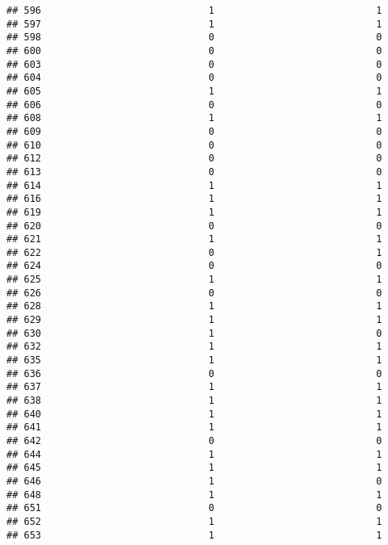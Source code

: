 \documentclass[
]{article}
\begin{document}
\begin{verbatim}
## 596                             1                            1
## 597                             1                            1
## 598                             0                            0
## 600                             0                            0
## 603                             0                            0
## 604                             0                            0
## 605                             1                            1
## 606                             0                            0
## 608                             1                            1
## 609                             0                            0
## 610                             0                            0
## 612                             0                            0
## 613                             0                            0
## 614                             1                            1
## 616                             1                            1
## 619                             1                            1
## 620                             0                            0
## 621                             1                            1
## 622                             0                            1
## 624                             0                            0
## 625                             1                            1
## 626                             0                            0
## 628                             1                            1
## 629                             1                            1
## 630                             1                            0
## 632                             1                            1
## 635                             1                            1
## 636                             0                            0
## 637                             1                            1
## 638                             1                            1
## 640                             1                            1
## 641                             1                            1
## 642                             0                            0
## 644                             1                            1
## 645                             1                            1
## 646                             1                            0
## 648                             1                            1
## 651                             0                            0
## 652                             1                            1
## 653                             1                            1

\end{verbatim}
\end{document}
